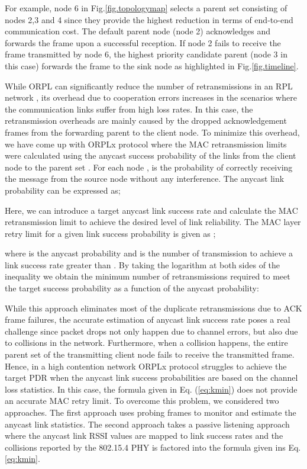 \documentclass[conference]{IEEEtran}
\begin{document}
For example, node 6 in Fig.\ref{fig.topologymap} selects a parent set consisting of nodes 2,3 and 4 since they provide the highest reduction in terms of end-to-end communication cost. The default parent node (node 2) acknowledges and forwards the frame upon a successful reception. If node 2 fails to receive the frame transmitted by node 6, the highest priority candidate parent (node 3 in this case) forwards the frame to the sink node as highlighted in Fig.\ref{fig.timeline}.   

While ORPL can significantly reduce the number of retransmissions in an RPL network \cite{orpl}, its overhead due to cooperation errors increases in the scenarios where the communication links suffer from high loss rates. In this case, the retransmission overheads are mainly caused by the dropped acknowledgement frames from the forwarding parent to the client node. To minimize this overhead, we have come up with ORPLx \cite{orpl-tpds} protocol where the MAC retransmission limits were calculated using the anycast success probability of the links from the client node  to the parent set . For each node ,  is the probability of correctly receiving the message from the source node without any interference. The anycast link probability can be expressed as;


Here, we can introduce a target anycast link success rate and calculate the MAC retransmission limit to achieve the desired level of link reliability. The MAC layer retry limit for a given link success probability  is given as \cite{orpl-tpds}; 



where  is the anycast probability and  is the number of transmission to achieve a link success rate greater than . By taking the logarithm at both sides
of the inequality we obtain the minimum number of retransmissions
required to meet the target success probability as a function of the
anycast probability:



While this approach eliminates most of the duplicate retransmissions due to ACK frame failures, the accurate estimation of anycast link success rate poses a real challenge since packet drops not only happen due to channel errors, but also due to collisions in the network. Furthermore, when a collision happens, the entire parent set of the transmitting client node fails to receive the transmitted frame. Hence, in a high contention network ORPLx protocol struggles to achieve the target PDR when the anycast link success probabilities are based on the channel loss statistics. In this case, the formula given in Eq. (\ref{eq:kmin}) does not provide an accurate MAC retry limit. To overcome this problem, we considered two approaches. The first approach uses probing frames to monitor and estimate the anycast link statistics. The second approach takes a passive listening approach where the anycast link RSSI values are mapped to link success rates and the collisions reported by the 802.15.4 PHY is factored into the formula given ins Eq. \ref{eq:kmin}.
\end{document}
